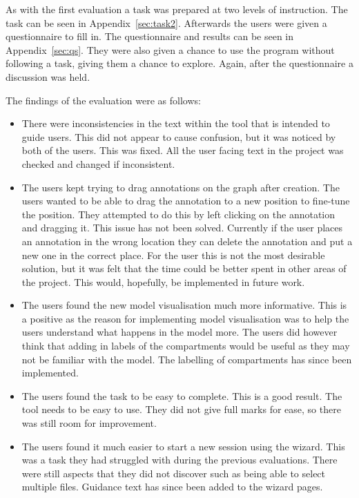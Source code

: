 As with the first evaluation a task was prepared at two levels of instruction.  The task can be seen in Appendix~\ref{sec:task2}.  Afterwards the users were given a questionnaire to fill in.  The questionnaire and results can be seen in Appendix~\ref{sec:qs}.  They were also given a chance to use the program without following a task, giving them a chance to explore.  Again, after the questionnaire a discussion was held.

The findings of the evaluation were as follows:

\begin{itemize}
\item There were inconsistencies in the text within the tool that is intended to guide users.  This did not appear to cause confusion, but it was noticed by both of the users.  This was fixed.  All the user facing text in the project was checked and changed if inconsistent.
\item The users kept trying to drag annotations on the graph after creation. The users wanted to be able to drag the annotation to a new position to fine-tune the position.  They attempted to do this by left clicking on the annotation and dragging it.  This issue has not been solved.  Currently if the user places an annotation in the wrong location they can delete the annotation and put a new one in the correct place.  For the user this is not the most desirable solution, but it was felt that the time could be better spent in other areas of the project.  This would, hopefully, be implemented in future work.
\item The users found the new model visualisation much more informative.  This is a positive as the reason for implementing model visualisation was to help the users understand what happens in the model more.  The users did however think that adding in labels of the compartments would be useful as they may not be familiar with the model.  The labelling of compartments has since been implemented.
\item The users found the task to be easy to complete.  This is a good result.  The tool needs to be easy to use.  They did not give full marks for ease, so there was still room for improvement.
\item The users found it much easier to start a new session using the wizard.  This was a task they had struggled with during the previous evaluations.  There were still aspects that they did not discover such as being able to select multiple files.  Guidance text has since been added to the wizard pages.

\end{itemize}
